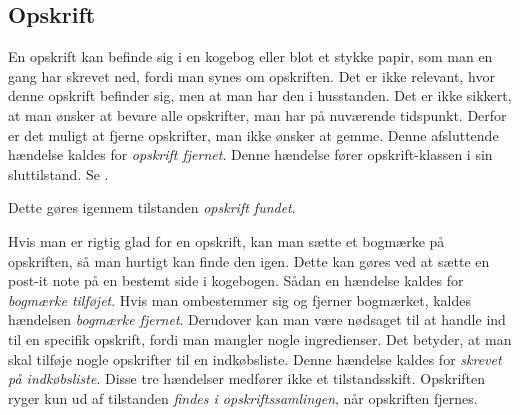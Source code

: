 \subsection{Opskrift}
En opskrift kan befinde sig i en kogebog eller blot et stykke papir, som man en gang har skrevet ned, fordi man synes om opskriften. Det er ikke relevant, hvor denne opskrift befinder sig, men at man har den i husstanden. Det er ikke sikkert, at man ønsker at bevare alle opskrifter, man har på nuværende tidspunkt. Derfor er det muligt at fjerne opskrifter, man ikke ønsker at gemme. Denne afsluttende hændelse kaldes for \textit{opskrift fjernet}. Denne hændelse fører opskrift-klassen i sin sluttilstand. Se .

 Dette gøres igennem tilstanden \textit{opskrift fundet}.

Hvis man er rigtig glad for en opskrift, kan man sætte et bogmærke på opskriften, så man hurtigt kan finde den igen. Dette kan \fx gøres ved at sætte en post-it note på en bestemt side i kogebogen. Sådan en hændelse kaldes for \textit{bogmærke tilføjet}. Hvis man ombestemmer sig og fjerner bogmærket, kaldes hændelsen \textit{bogmærke fjernet}. Derudover kan man være nødsaget til at handle ind til en specifik opskrift, fordi man mangler nogle ingredienser. Det betyder, at man skal tilføje nogle opskrifter til en indkøbsliste. Denne hændelse kaldes for \textit{skrevet på indkøbsliste}. Disse tre hændelser medfører ikke et tilstandsskift. Opskriften ryger kun ud af tilstanden \textit{findes i opskriftssamlingen}, når opskriften fjernes.

\begin{figure}[H]
	\centering
	\scalebox{0.8}{
	}
	\label{fig:opskrift-adfaerd}
\end{figure}	
